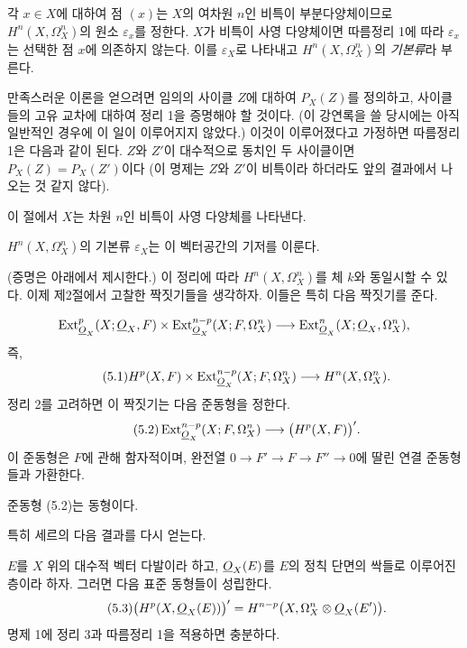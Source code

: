 각 $x\in X$에 대하여 점 $(x)$는 $X$의 여차원 $n$인 비특이
부분다양체이므로 $H^{n}(X,\Omega_X^{n})$의 원소 $\varepsilon_x$를 정한다.
$X$가 비특이 사영 다양체이면 따름정리 1에 따라 $\varepsilon_x$는 선택한
점 $x$에 의존하지 않는다. 이를 $\varepsilon_X$로 나타내고
$H^{n}(X,\Omega_X^{n})$의 \emph{기본류}라 부른다.

 만족스러운 이론을 얻으려면 임의의 사이클 $Z$에 대하여
$P_X(Z)$를 정의하고, 사이클들의 고유 교차에 대하여 정리 1을 증명해야 할
것이다. (이 강연록을 쓸 당시에는 아직 일반적인 경우에 이 일이 이루어지지
않았다.) 이것이 이루어졌다고 가정하면 따름정리 1은 다음과 같이 된다.
$Z$와 $Z'$이 대수적으로 동치인 두 사이클이면 $P_X(Z)=P_X(Z')$이다
(이 명제는 $Z$와 $Z'$이 비특이라 하더라도 앞의 결과에서 나오는 것 같지
않다).


이 절에서 $X$는 차원 $n$인 비특이 사영 다양체를 나타낸다.

 $H^{n}(X,\Omega_X^{n})$의 기본류 $\varepsilon_X$는 이
벡터공간의 기저를 이룬다.

(증명은 아래에서 제시한다.) 이 정리에 따라
$H^{n}(X,\Omega_X^{n})$를 체 $k$와 동일시할 수 있다. 이제 제2절에서
고찰한 짝짓기들을 생각하자. 이들은 특히 다음 짝짓기를 준다.

\[
\operatorname{Ext}_{\underline{O}_X}^{p}(X;\underline{O}_X,F)
\times\operatorname{Ext}_{\underline{O}_X}^{n-p}(X;F,\Omega_X^{n})
\longrightarrow
\operatorname{Ext}_{\underline{O}_X}^{n}(X;\underline{O}_X,\Omega_X^{n}),
\]
즉,
\begin{equation}\tag{5.1}
  H^{p}(X,F)
  \times\operatorname{Ext}_{\underline{O}_X}^{n-p}(X;F,\Omega_X^{n})
  \longrightarrow H^{n}(X,\Omega_X^{n}).
\end{equation}
정리 2를 고려하면 이 짝짓기는 다음 준동형을 정한다.
\begin{equation}\tag{5.2}
  \operatorname{Ext}_{\underline{O}_X}^{n-p}(X;F,\Omega_X^{n})
  \longrightarrow\bigl(H^{p}(X,F)\bigr)'.
\end{equation}
이 준동형은 $F$에 관해 함자적이며, 완전열
$0\longrightarrow F'\longrightarrow F\longrightarrow F''
\longrightarrow0$에 딸린 연결 준동형들과 가환한다.

 준동형 (5.2)는 동형이다.

특히 세르의 다음 결과를 다시 얻는다.

 $E$를 $X$ 위의 대수적 벡터 다발이라 하고,
$\underline{O}_X(E)$를 $E$의 정칙 단면의 싹들로 이루어진 층이라 하자. 그러면
다음 표준 동형들이 성립한다.
\begin{equation}\tag{5.3}
  \bigl(H^{p}(X,\underline{O}_X(E))\bigr)'
  =H^{n-p}\bigl(X,\Omega_X^{n}\otimes\underline{O}_X(E')\bigr).
\end{equation}
명제 1에 정리 3과 따름정리 1을 적용하면 충분하다.

